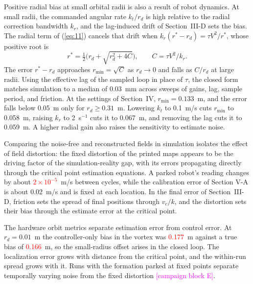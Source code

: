 \documentclass[lettersize,journal]{IEEEtran}
\newcommand{\syn}[1]{\textcolor{red}{#1}}            %
\newcommand{\rev}[1]{#1}                             %
\newcommand{\open}[1]{\textcolor{magenta}{[#1]}}     %
\begin{document}
Positive radial bias at small orbital radii is also a result of robot dynamics. At small radii, the commanded angular rate $k_t / r_d$ is high relative to the radial correction bandwidth $k_r$, and the lag-induced drift of Section~III-D sets the bias. The radial term of (\ref{eq:11}) cancels that drift when $k_r(r^* - r_d) = \tau V^2/r^*$, whose positive root is
\begin{equation}\label{eq:orbit_cf}
r^* = \tfrac{1}{2}\bigl(r_d + \sqrt{r_d^2 + 4C}\bigr), \qquad C = \tau V^2/k_r.
\end{equation}
The error $r^* - r_d$ approaches $r_{\min} = \sqrt{C}$ as $r_d \to 0$ and falls as $C/r_d$ at large radii. Using the effective lag of the sampled loop in place of $\tau$, the closed form matches simulation to a median of \rev{0.03}~mm across sweeps of gains, lag, sample period, and friction. At the settings of Section~IV, $r_{\min} = \rev{0.133}$~m, and the error falls below 0.05~m only for $r_d \ge \rev{0.31}$~m. Lowering $k_t$ to 0.1~m/s cuts $r_{\min}$ to \rev{0.058}~m, raising $k_r$ to 2~s$^{-1}$ cuts it to \rev{0.067}~m, and removing the lag cuts it to \rev{0.059}~m. %
A higher radial gain also raises the sensitivity to estimate noise.

Comparing the noise-free and reconstructed fields in simulation isolates the effect of field distortion: the fixed distortion of the printed maps appears to be the driving factor of the simulation-reality gap, with its errors propagating directly through the critical point estimation equations. A parked robot's reading changes by about \syn{$2\times10^{-5}$}~m/s between cycles, while the calibration error of Section V-A is about 0.02~m/s and is fixed at each location. %
In the final error of Section~III-D, friction sets the spread of final positions through $v_c/k$, and the distortion sets their bias through the estimate error at the critical point.

The hardware orbit metrics separate estimation error from control error. At $r_d = 0.01$~m the controller-only bias in the vortex was \syn{0.177}~m against a true bias of \syn{0.166}~m, so the small-radius offset arises in the closed loop. The localization error grows with distance from the critical point, and the within-run spread grows with it. Runs with the formation parked at fixed points separate temporally varying noise from the fixed distortion \open{campaign block E}. %
\end{document}
